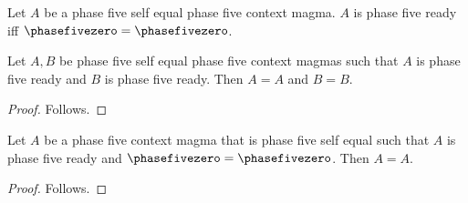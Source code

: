 

\begin{definition}\label{notion_structure_ready}
    Let $A$ be a phase five self equal phase five context magma.
    $A$ is phase five ready iff $\phasefivezero=\phasefivezero$.
\end{definition}

\begin{proposition}\label{notion_structure_completed_head}
    Let $A,B$ be phase five self equal phase five context magmas such that
        $A$ is phase five ready and $B$ is phase five ready.
    Then $A=A$ and $B=B$.
\end{proposition}
\begin{proof}
    Follows.
\end{proof}

\begin{proposition}\label{notion_structure_completed_right}
    Let $A$ be a phase five context magma that is phase five self equal such that
        $A$ is phase five ready and $\phasefivezero=\phasefivezero$.
    Then $A=A$.
\end{proposition}
\begin{proof}
    Follows.
\end{proof}
